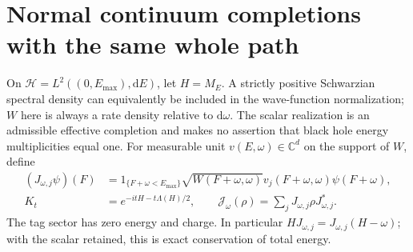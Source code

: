 \documentclass[11pt]{article}
\newcommand{\dd}{\mathrm d}
\newcommand{\HH}{\mathcal H}
\begin{document}
\section{Normal continuum completions with the same whole path}

On \(\HH=L^2((0,E_{\max}),\dd E)\), let \(H=M_E\). A strictly positive Schwarzian spectral density can equivalently be included in the wave-function normalization; \(W\) here is always a rate density relative to \(\dd\omega\). The scalar realization is an admissible effective completion and makes no assertion that black hole energy multiplicities equal one. For measurable unit \(v(E,\omega)\in\mathbb C^d\) on the support of \(W\), define
\begin{align}
 (J_{\omega,j}\psi)(F)
 &=1_{\{F+\omega<E_{\max}\}}\sqrt{W(F+\omega,\omega)}
                v_j(F+\omega,\omega)\psi(F+\omega), \label{eq:jump}\\
 K_t&=e^{-itH-t\Lambda(H)/2}, \qquad
 \mathcal J_\omega(\rho)=\sum_j J_{\omega,j}\rho J_{\omega,j}^*.\nonumber
\end{align}
The tag sector has zero energy and charge. In particular \(HJ_{\omega,j}=J_{\omega,j}(H-\omega)\); with the scalar retained, this is exact conservation of total energy.
\end{document}
